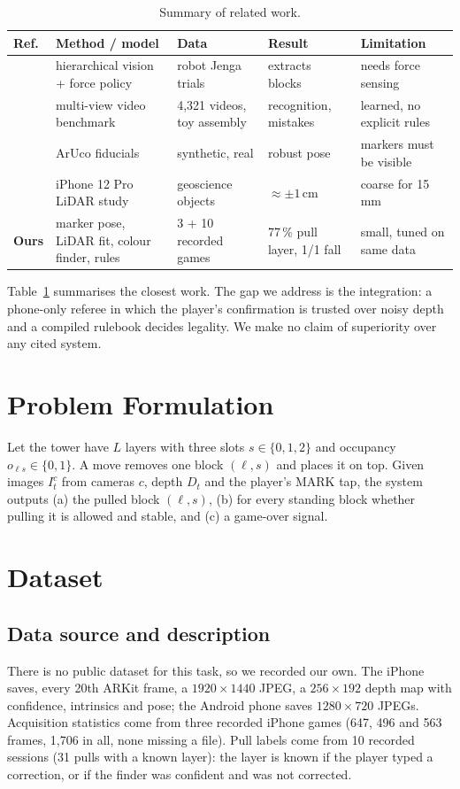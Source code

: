 \documentclass[12pt,a4paper]{article}
\begin{document}
\begin{table}[h]
\centering\small\singlespacing
\caption{Summary of related work.}\label{tab:rel}
\begin{tabular}{@{}p{0.5cm}p{3.1cm}p{3.3cm}p{3.6cm}p{2.7cm}@{}}
\toprule
Ref. & Method / model & Data & Result & Limitation \\
\midrule
\cite{fazeli} & hierarchical vision + force policy & robot Jenga trials & extracts blocks & needs force sensing \\
\cite{sener} & multi-view video benchmark & 4{,}321 videos, toy assembly & recognition, mistakes & learned, no explicit rules \\
\cite{garrido} & ArUco fiducials & synthetic, real & robust pose & markers must be visible \\
\cite{luetz} & iPhone 12 Pro LiDAR study & geoscience objects & $\approx\pm1$\,cm & coarse for 15\,mm \\
\textbf{Ours} & marker pose, LiDAR fit, colour finder, rules & 3 + 10 recorded games & 77\,\% pull layer, 1/1 fall & small, tuned on same data \\
\bottomrule
\end{tabular}
\end{table}
Table~\ref{tab:rel} summarises the closest work. The gap we address is the integration: a phone-only referee in which the player's confirmation is trusted over noisy depth and a compiled rulebook decides legality. We make no claim of superiority over any cited system.

\section{Problem Formulation}
Let the tower have $L$ layers with three slots $s\in\{0,1,2\}$ and occupancy $o_{\ell s}\in\{0,1\}$. A move removes one block $(\ell,s)$ and places it on top. Given images $I_t^c$ from cameras $c$, depth $D_t$ and the player's MARK tap, the system outputs (a) the pulled block $(\ell,s)$, (b) for every standing block whether pulling it is allowed and stable, and (c) a game-over signal.

\section{Dataset}
\subsection{Data source and description}
There is no public dataset for this task, so we recorded our own. The iPhone saves, every 20th ARKit frame, a $1920\times1440$ JPEG, a $256\times192$ depth map with confidence, intrinsics and pose; the Android phone saves $1280\times720$ JPEGs. Acquisition statistics come from three recorded iPhone games (647, 496 and 563 frames, 1{,}706 in all, none missing a file). Pull labels come from 10 recorded sessions (31 pulls with a known layer): the layer is known if the player typed a correction, or if the finder was confident and was not corrected.
\end{document}
